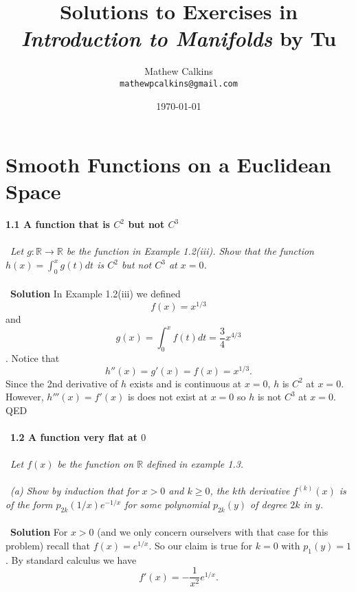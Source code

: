\documentclass[12 pt]{article}
\newcommand{\R}{\mathbb{R}}
\numberwithin{equation}{section}
\begin{document}
\title{Solutions to Exercises in \textit{Introduction to Manifolds} by Tu}
\author{Mathew Calkins\\
  \texttt{mathewpcalkins@gmail.com}}

\date{\today}

\maketitle


\section{Smooth Functions on a Euclidean Space}

\textbf{1.1 A function that is $C^2$ but not $C^3$}\\
\\
\
\textit{Let $g: \R \to \R$ be the function in Example 1.2(iii). Show that the function $h(x) = \int_0 ^x g(t) dt$ is $C^2$ but not $C^3$ at $x = 0$.}\\
\\
\
\textbf{Solution} In Example 1.2(iii) we defined \begin{equation*}
f(x) = x^{1/3}
\end{equation*}
and \begin{equation*}
g(x) = \int_0 ^x f(t) dt = \frac{3}{4} x^{4/3}
\end{equation*}.
Notice that \begin{equation*}
h''(x) = g'(x) = f(x) = x^{1/3}.
\end{equation*}
Since the 2nd derivative of $h$ exists and is continuous at $x = 0$, $h$ is $C^2$ at $x = 0$. However, $h'''(x) = f'(x)$ is does not exist at $x = 0$ so $h$ is not $C^3$ at $x = 0$. QED\\
\\
\
\textbf{1.2 A function very flat at $0$}\\
\\
\
\textit{Let $f(x)$ be the function on $\R$ defined in example 1.3.}\\
\\
\
\textit{(a) Show by induction that for $x > 0$ and $k \geq 0$, the $k$th derivative $f^{(k)}(x)$ is of the form $p_{2k}(1/x) e^{-1/x}$ for some polynomial $p_{2k}(y)$ of degree $2k$ in $y$.}\\
\\
\
\textbf{Solution} For $x > 0$ (and we only concern ourselvers with that case for this problem) recall that $f(x) = e^{1/x}$. So our claim is true for $k = 0$ with $p_1(y) = 1$. By standard calculus we have \begin{equation*}
f'(x) = - \frac{1}{x^2} e^{1/x}.
\end{equation*}
\end{document}
